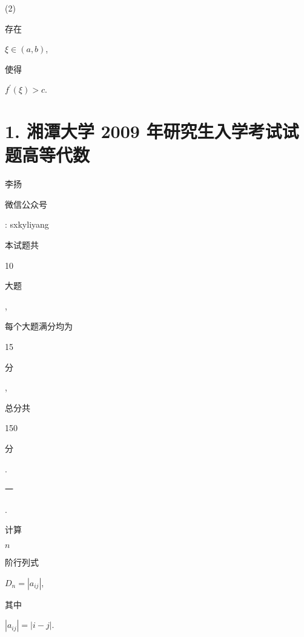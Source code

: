 \documentclass[10pt]{article}
\begin{document}
(2) \begin{CJK}{UTF8}{mj}存在\end{CJK} $\xi \in(a, b)$, \begin{CJK}{UTF8}{mj}使得\end{CJK} $f^{\prime}(\xi)>c$.

\section{1. 湘潭大学 2009 年研究生入学考试试题高等代数}
\begin{CJK}{UTF8}{mj}李扬\end{CJK}

\begin{CJK}{UTF8}{mj}微信公众号\end{CJK}: sxkyliyang

\begin{CJK}{UTF8}{mj}本试题共\end{CJK} 10 \begin{CJK}{UTF8}{mj}大题\end{CJK}, \begin{CJK}{UTF8}{mj}每个大题满分均为\end{CJK} 15 \begin{CJK}{UTF8}{mj}分\end{CJK}, \begin{CJK}{UTF8}{mj}总分共\end{CJK} 150 \begin{CJK}{UTF8}{mj}分\end{CJK}.

\begin{CJK}{UTF8}{mj}一\end{CJK}. \begin{CJK}{UTF8}{mj}计算\end{CJK} $n$ \begin{CJK}{UTF8}{mj}阶行列式\end{CJK} $D_{n}=\left|a_{i j}\right|$, \begin{CJK}{UTF8}{mj}其中\end{CJK} $\left|a_{i j}\right|=|i-j|$.
\end{document}

